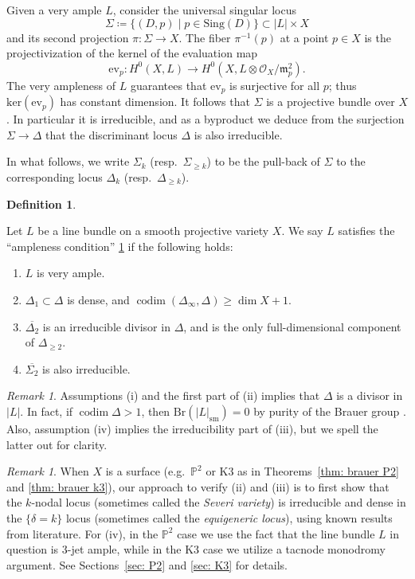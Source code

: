 \documentclass[11pt]{amsart}
\makeatletter
\theoremstyle{plain}
\theoremstyle{definition}
\newtheorem{defn}[thm]{Definition}
\theoremstyle{remark}
\newtheorem{rmk}[thm]{Remark}
\newcommand{\customlabel}[2]{%
   \protected@edef\@currentlabel{#2}\label{#1}%
}
\makeatother
\begin{document}
Given a very ample $L$, consider the universal singular locus
     \[
     \Sigma\coloneq \{(D,p)\mid p\in \mathrm{Sing}(D)\} \subset |L|\times X
     \]
     and its second projection $\pi: \Sigma \to X$. The fiber $\pi^{-1}(p)$ at a point $p\in X$ is the projectivization of the kernel of the evaluation map
     \[
     \mathrm{ev}_p: H^0(X, L) \longrightarrow H^0(X, L\otimes \mathcal{O}_X/\mathfrak{m}_p^2).
     \]
     The very ampleness of $L$ guarantees that $\mathrm{ev}_p$ is surjective for all $p$; thus $\mathrm{ker}(\mathrm{ev}_p)$ has constant dimension. It follows that $\Sigma$ is a projective bundle over $X$. In particular it is irreducible, and as a byproduct we deduce from the surjection $\Sigma \to \Delta$ that the discriminant locus $\Delta$ is also irreducible.

     \smallskip

     In what follows, we write $\Sigma_k$ (resp.~$\Sigma_{\geq k}$) to be the pull-back of $\Sigma$ to the corresponding locus $\Delta_k$ (resp.~$\Delta_{\geq k}$). 


\begin{defn}\customlabel{defn: ampleness}{$(\dagger)$}
    Let $L$ be a line bundle on a smooth projective variety $X$. We say $L$ satisfies the ``ampleness condition'' \ref{defn: ampleness} if the following holds:
\begin{enumerate}
    \item $L$ is very ample.
    \item $\Delta_1 \subset \Delta$ is dense, and $\operatorname{codim}(\Delta_\infty, \Delta)\geq \dim X + 1$.
    \item $\overline{\Delta_{2}}$ is an irreducible divisor in $\Delta$, and is the only full-dimensional component of $\Delta_{\geq 2}$.

    \item $\overline{\Sigma_2}$ is also irreducible.
\end{enumerate}
\end{defn}

\begin{rmk}
    Assumptions (i) and the first part of (ii) implies that $\Delta$ is a divisor in $|L|$. In fact, if $\operatorname{codim} \Delta >1$, then $\mathrm{Br}(|L|_\mathrm{sm}) = 0$ by purity of the Brauer group \cite{Brauerpurity}. Also, assumption (iv) implies the irreducibility part of (iii), but we spell the latter out for clarity.
    \end{rmk}

    \begin{rmk} \label{rmk: strategy to check dagger}
    When $X$ is a surface (e.g.~$\mathbb P^2$ or K3 as in Theorems~\ref{thm: brauer P2} and \ref{thm: brauer k3}), our approach to verify (ii) and (iii) is to first show that the $k${-nodal} locus (sometimes called the \textit{Severi variety}) is irreducible and dense in the $\{\delta = k\}$ locus (sometimes called the \textit{equigeneric locus}), using known results from literature. For (iv), in the $\mathbb P^2$ case we use the fact that the line bundle $L$ in question is $3$-jet ample, while in the K3 case we utilize a tacnode monodromy argument. See Sections~\ref{sec: P2} and \ref{sec: K3} for details. %
\end{rmk}
\end{document}
